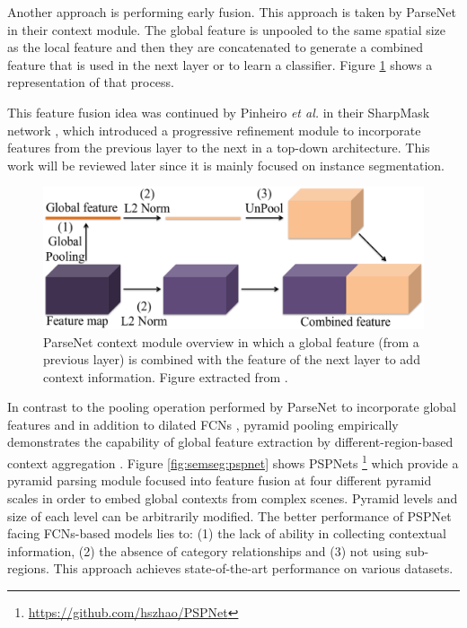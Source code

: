 Another approach is performing early fusion. This approach is taken by ParseNet\cite{Liu2015} in their context module. The global feature is unpooled to the same spatial size as the local feature and then they are concatenated to generate a combined feature that is used in the next layer or to learn a classifier. Figure \ref{fig:parsenet-module} shows a representation of that process.

This feature fusion idea was continued by Pinheiro \emph{et al.} in their SharpMask network \cite{Pinheiro2016}, which introduced a progressive refinement module to incorporate features from the previous layer to the next in a top-down architecture. This work will be reviewed later since it is mainly focused on instance segmentation.

\begin{figure}[!hbt]
	\centering
	\includegraphics[width=0.8\linewidth]{Figures/Segmentation/parsenetmodule.eps}
	\caption{ParseNet context module overview in which a global feature (from a previous layer) is combined with the feature of the next layer to add context information. Figure extracted from \cite{Liu2015}.}
	\label{fig:parsenet-module}
\end{figure}

\clearpage

In contrast to the pooling operation performed by ParseNet to incorporate global features and in addition to dilated \acsp{FCN} \cite{Chen2014a}\cite{Yu2015}, pyramid pooling empirically demonstrates the capability of global feature extraction by different-region-based context aggregation \cite{Zhao2016}. Figure \ref{fig:semseg:pspnet} shows \acfp{PSPNet} \footnote{\url{https://github.com/hszhao/PSPNet}} which provide a pyramid parsing module focused into feature fusion at four different pyramid scales in order to embed global contexts from complex scenes. Pyramid levels and size of each level can be arbitrarily modified. The better performance of \acs{PSPNet} facing \acsp{FCN}-based models lies to: (1) the lack of ability in collecting contextual information, (2) the absence of category relationships and (3) not using sub-regions. This approach achieves state-of-the-art performance on various datasets. 

